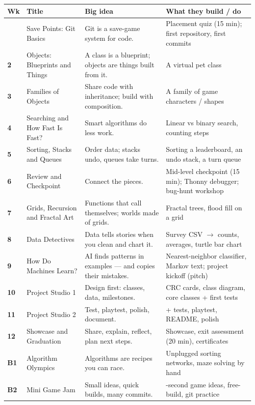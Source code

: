 \documentclass[level=3,teacher]{kidscode}
\begin{document}
\begin{longtable}{@{}>{\bfseries}p{0.8cm}>{\raggedright\arraybackslash}p{3.6cm}>{\raggedright\arraybackslash}p{5.6cm}>{\raggedright\arraybackslash}p{\dimexpr\linewidth-10cm-6\tabcolsep}@{}}
\toprule
\rowcolor{kcaccent!15} Wk & Title & Big idea & What they build / do\\ \midrule\endhead
\bottomrule\endfoot
1 & Save Points: Git Basics & Git is a save-game system for code. & Placement quiz (15 min); first repository, first commits\\ \midrule
2 & Objects: Blueprints and Things & A class is a blueprint; objects are things built from it. & A virtual pet class\\ \midrule
3 & Families of Objects & Share code with inheritance; build with composition. & A family of game characters / shapes\\ \midrule
4 & Searching and How Fast Is Fast? & Smart algorithms do less work. & Linear vs binary search, counting steps\\ \midrule
5 & Sorting, Stacks and Queues & Order data; stacks undo, queues take turns. & Sorting a leaderboard, an undo stack, a turn queue\\ \midrule
6 & Review and Checkpoint & Connect the pieces. & Mid-level checkpoint (15 min); Thonny debugger; bug-hunt workshop\\ \midrule
7 & Grids, Recursion and Fractal Art & Functions that call themselves; worlds made of grids. & Fractal trees, flood fill on a grid\\ \midrule
8 & Data Detectives & Data tells stories when you clean and chart it. & Survey CSV $\rightarrow$ counts, averages, turtle bar chart\\ \midrule
9 & How Do Machines Learn? & AI finds patterns in examples --- and copies their mistakes. & Nearest-neighbor classifier, Markov text; project kickoff (pitch)\\ \midrule
10 & Project Studio 1 & Design first: classes, data, milestones. & CRC cards, class diagram, core classes + first tests\\ \midrule
11 & Project Studio 2 & Test, playtest, polish, document. & 5+ tests, playtest, README, polish\\ \midrule
12 & Showcase and Graduation & Share, explain, reflect, plan next steps. & Showcase, exit assessment (20 min), certificates\\ \midrule
B1 & Algorithm Olympics & Algorithms are recipes you can race. & Unplugged sorting networks, maze solving by hand\\ \midrule
B2 & Mini Game Jam & Small ideas, quick builds, many commits. & 90-second game ideas, free-build, git practice\\
\end{longtable}
\end{document}
